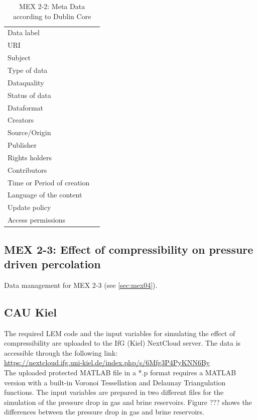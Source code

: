 \begin{table}[h!]
\caption{MEX 2-2: Meta Data according to Dublin Core}
\label{tab:}
\small
\begin{tabular}{R{3cm}|L{7cm}}
\hline
%
Data label &  \\
URI &  \\
Subject  &  \\
Type of data  &  \\
Dataquality  &  \\
Status of data  &  \\
Dataformat  & \\
Creators  &  \\
Source/Origin &  \\
Publisher  &  \\
Rights holders &  \\
Contributors &  \\
Time or Period of creation &  \\
Language of the content &  \\
Update policy &  \\
Access permissions &  \\
%
\hline
\end{tabular}
\end{table}

\subsection{MEX 2-3: Effect of compressibility on pressure driven percolation}

Data management for MEX 2-3 (see \ref{sec:mex04}).

\subsection*{CAU Kiel}

The required LEM code and the input variables for simulating the effect of compressibility are uploaded to the IfG (Kiel) NextCloud server. The data is accessible through the following link:\\
\hyperlink{https://nextcloud.ifg.uni-kiel.de/index.php/s/6Mfg3P4PyKNN6By}{https://nextcloud.ifg.uni-kiel.de/index.php/s/6Mfg3P4PyKNN6By}\\

The uploaded protected MATLAB file in a *.p format requires a MATLAB version with a built-in Voronoi Tessellation and Delaunay Triangulation functions. The input variables are prepared in two different files for the simulation of the pressure drop in gas and brine reservoirs. Figure ??? shows the differences between the pressure drop in gas and brine reservoirs.

